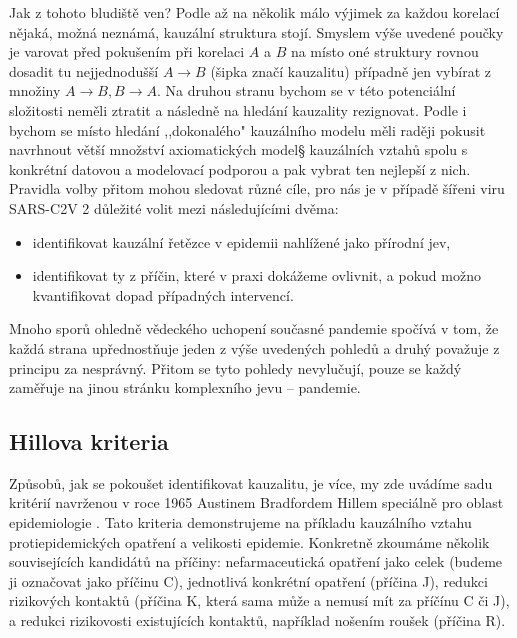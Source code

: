 Jak z tohoto bludiště ven? Podle \cite{shipley_2000} až na několik málo výjimek za každou korelací nějaká, možná neznámá, kauzální struktura stojí. Smyslem výše uvedené poučky je varovat před pokušením při korelaci $A$ a $B$ na místo oné struktury rovnou dosadit tu nejjednodušší $A\rightarrow B$ (šipka značí kauzalitu) případně jen vybírat z množiny $A\rightarrow B, B\rightarrow A$. Na druhou stranu bychom se v této potenciální složitosti neměli ztratit a následně na hledání kauzality rezignovat. Podle \cite{shipley_2000} i \cite{pearl2009causality} bychom se místo hledání ,,dokonalého" kauzálního modelu měli raději pokusit navrhnout větší množství axiomatických model§ kauzálních vztahů spolu s konkrétní datovou a modelovací podporou a pak vybrat ten nejlepší z nich. Pravidla volby přitom mohou sledovat různé cíle, pro nás je v případě šířeni viru SARS-C2V 2 důležité volit mezi následujícími dvěma:
\begin{itemize}
\item identifikovat kauzální řetězce v epidemii nahlížené jako přírodní jev,
\item identifikovat ty z příčin, které v praxi dokážeme ovlivnit, a pokud možno kvantifikovat dopad případných intervencí.
\end{itemize}
Mnoho sporů ohledně vědeckého uchopení současné pandemie spočívá v tom, že každá strana  upřednostňuje jeden z výše uvedených pohledů a druhý považuje z principu za nesprávný. Přitom se tyto pohledy nevylučují, pouze se každý zaměřuje na jinou stránku komplexního jevu -- pandemie. 


\subsection*{Hillova kriteria}

Způsobů, jak se pokoušet identifikovat kauzalitu, je více,
my zde uvádíme sadu kritérií navrženou v roce 1965 Austinem Bradfordem Hillem
speciálně pro oblast epidemiologie \cite{hill1965environment}. Tato kriteria demonstrujeme na příkladu kauzálního vztahu  protiepidemických opatření a velikosti epidemie. Konkretně zkoumáme několik souvisejících kandidátů na příčiny: nefarmaceutická opatření jako celek (budeme ji označovat jako příčinu C),
jednotlivá konkrétní opatření (příčina J), redukci rizikových
kontaktů (příčina K, která sama může a nemusí mít za příčínu C či
J), a redukci rizikovosti existujících kontaktů, například nošením roušek (příčina
R). 

